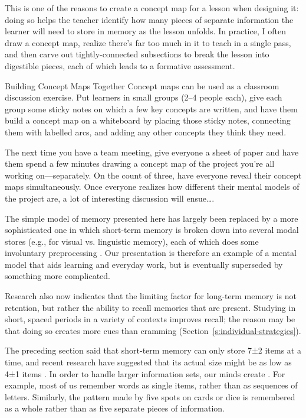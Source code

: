 This is one of the reasons to create a concept map for a lesson when
designing it: doing so helps the teacher identify how many pieces of
separate information the learner will need to store in memory as the
lesson unfolds. In practice, I often draw a concept map, realize there's
far too much in it to teach in a single pass, and then carve out
tightly-connected subsections to break the lesson into digestible
pieces, each of which leads to a formative assessment.

\begin{aside}{Building Concept Maps Together}
  Concept maps can be used as a classroom discussion exercise. Put
  learners in small groups (2--4 people each), give each group some
  sticky notes on which a few key concepts are written, and have them
  build a concept map on a whiteboard by placing those sticky notes,
  connecting them with labelled arcs, and adding any other concepts they
  think they need.

  The next time you have a team meeting, give everyone a sheet of paper
  and have them spend a few minutes drawing a concept map of the project
  you're all working on---separately. On the count of three, have everyone
  reveal their concept maps simultaneously. Once everyone realizes how
  different their mental models of the project are, a lot of interesting
  discussion will ensue{\ldots}.
\end{aside}

The simple model of memory presented here has largely been replaced by a
more sophisticated one in which short-term memory is broken down into
several modal stores (e.g., for visual vs. linguistic memory), each of
which does some involuntary preprocessing \cite{Mill2016a}. Our
presentation is therefore an example of a mental model that aids
learning and everyday work, but is eventually superseded by something
more complicated.

Research also now indicates that the limiting factor for long-term
memory is not retention, but rather the ability to recall memories that
are present. Studying in short, spaced periods in a variety of contexts
improves recall; the reason may be that doing so creates more cues than
cramming (Section~\ref{s:individual-strategies}).


The preceding section said that short-term memory can only store
7±2 items at a time, and recent research have suggested that its
actual size might be as low as 4±1 items \cite{Dida2016}. In
order to handle larger information sets, our minds create
. For example, most of us remember words
as single items, rather than as sequences of letters. Similarly, the
pattern made by five spots on cards or dice is remembered as a whole
rather than as five separate pieces of information.

